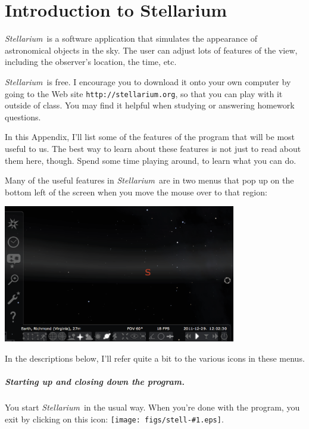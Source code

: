 \chapter{Introduction to Stellarium}
\label{app:stell}
\newcommand{\stellarium}{\textit{Stellarium}}
\newcommand{\icon}[1]{\texttt{[image: figs/stell-\#1.eps]}}

\bigskip\bigskip

\stellarium\ is a software application that simulates the appearance
of astronomical objects in the sky. The user can adjust lots of
features of the view, including the observer's location,
the time, etc.

\stellarium\ is free. I encourage you to download it onto your own computer
by going to the Web site {\tt http://stellarium.org},
so that you can play with it outside of class. You may find it helpful when 
studying or answering homework questions.

In this Appendix, I'll list some of the features of the program that will
be most useful to us. The best way to learn about these features is not
just to read about them here, though. Spend some time playing around, to learn
what you can do.

Many of the useful features in \stellarium\ are in two menus that pop up
on the bottom left of the screen when you move the mouse over to
that region:

\includegraphics[width=4in]{figs/stellarium-icons.eps}

In the descriptions below, I'll refer quite a bit to
the various icons in these menus. 

\paragraph{Starting up and closing down the program.}
You start \stellarium\ in the usual way.
When you're done with the program, you exit by
clicking on this icon: \icon{exit}.

